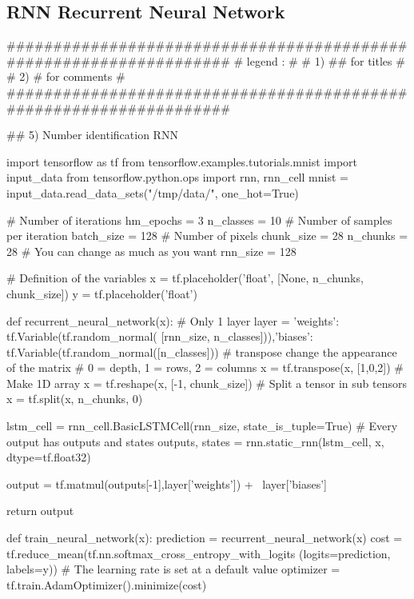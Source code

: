 \documentclass[11pt]{article}
\begin{document}
\subsection{RNN Recurrent Neural Network}
\begin{python}
###################################################################
# legend :                                                        #
#         1) ## for titles                                        #
#         2) #  for comments                                      #
###################################################################   

## 5) Number identification RNN

import tensorflow as tf
from tensorflow.examples.tutorials.mnist import input_data
from tensorflow.python.ops import rnn, rnn_cell
mnist = input_data.read_data_sets("/tmp/data/",
                                  one_hot=True)

# Number of iterations
hm_epochs = 3
n_classes = 10
# Number of samples per iteration
batch_size = 128
# Number of pixels
chunk_size = 28
n_chunks = 28
# You can change as much as you want
rnn_size = 128

# Definition of the variables
x = tf.placeholder('float', [None, n_chunks, chunk_size])
y = tf.placeholder('float')


def recurrent_neural_network(x):
    # Only 1 layer
    layer = {'weights': tf.Variable(tf.random_normal(
             [rnn_size, n_classes])),'biases':
             tf.Variable(tf.random_normal([n_classes]))}
    # transpose change the appearance of the matrix
    # 0 = depth,  1 = rows,  2 = columns
    x = tf.transpose(x, [1,0,2])
    # Make 1D array
    x = tf.reshape(x, [-1, chunk_size])
    # Split a tensor in sub tensors
    x = tf.split(x, n_chunks, 0)

    lstm_cell = rnn_cell.BasicLSTMCell(rnn_size,
                                       state_is_tuple=True)
    # Every output has outputs and states
    outputs, states = rnn.static_rnn(lstm_cell, x,
                                     dtype=tf.float32)

    output = tf.matmul(outputs[-1],layer['weights']) + \
             layer['biases']

    return output


def train_neural_network(x):
    prediction = recurrent_neural_network(x)
    cost = tf.reduce_mean(tf.nn.softmax_cross_entropy_with_logits
                          (logits=prediction, labels=y))
    # The learning rate is set at a default value
    optimizer = tf.train.AdamOptimizer().minimize(cost)


\end{python}
\end{document}
